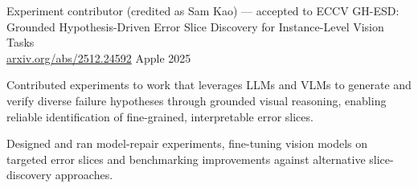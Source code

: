 \begin{cventries}
   \cventry
    {Experiment contributor (credited as Sam Kao) --- accepted to ECCV}
    {GH-ESD: Grounded Hypothesis-Driven Error Slice Discovery for Instance-Level Vision Tasks \\ \small{\href{https://arxiv.org/abs/2512.24592}{arxiv.org/abs/2512.24592}}}
    {Apple}
    {2025}
    {
      \begin{cvitems}
        \item{Contributed experiments to work that leverages LLMs and VLMs to generate and verify diverse failure hypotheses through grounded visual reasoning, enabling reliable identification of fine-grained, interpretable error slices.}
        \item{Designed and ran model-repair experiments, fine-tuning vision models on targeted error slices and benchmarking improvements against alternative slice-discovery approaches.}
      \end{cvitems}
    }
\end{cventries}
